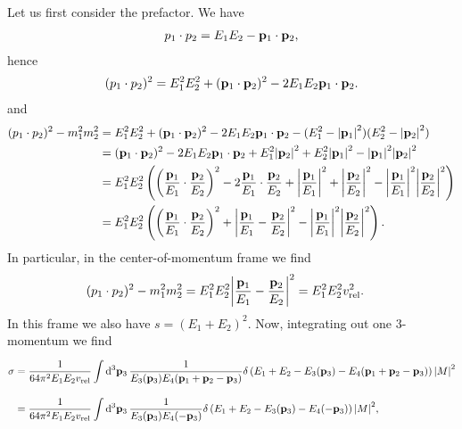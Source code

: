 Let us first consider the prefactor. We have
\begin{align*}
	p_{1}\cdot p_{2} = E_{1}E_{2} - \vb{p}_{1}\cdot\vb{p}_{2},
\end{align*}
hence
\begin{align*}
	(p_{1}\cdot p_{2})^{2} = E_{1}^{2}E_{2}^{2} + (\vb{p}_{1}\cdot\vb{p}_{2})^{2} - 2E_{1}E_{2}\vb{p}_{1}\cdot\vb{p}_{2}.
\end{align*}
and
\begin{align*}
	(p_{1}\cdot p_{2})^{2} - m_{1}^{2}m_{2}^{2} &= E_{1}^{2}E_{2}^{2} + (\vb{p}_{1}\cdot\vb{p}_{2})^{2} - 2E_{1}E_{2}\vb{p}_{1}\cdot\vb{p}_{2} - (E_{1}^{2} - \abs{\vb{p}_{1}}^{2})(E_{2}^{2} - \abs{\vb{p}_{2}}^{2}) \\
	&= (\vb{p}_{1}\cdot\vb{p}_{2})^{2} - 2E_{1}E_{2}\vb{p}_{1}\cdot\vb{p}_{2} + E_{1}^{2}\abs{\vb{p}_{2}}^{2} + E_{2}^{2}\abs{\vb{p}_{1}}^{2} - \abs{\vb{p}_{1}}^{2}\abs{\vb{p}_{2}}^{2} \\
	&= E_{1}^{2}E_{2}^{2}\left(\left(\frac{\vb{p}_{1}}{E_{1}}\cdot\frac{\vb{p}_{2}}{E_{2}}\right)^{2} - 2\frac{\vb{p}_{1}}{E_{1}}\cdot\frac{\vb{p}_{2}}{E_{2}} + \abs{\frac{\vb{p}_{1}}{E_{1}}}^{2} + \abs{\frac{\vb{p}_{2}}{E_{2}}}^{2} - \abs{\frac{\vb{p}_{1}}{E_{1}}}^{2}\abs{\frac{\vb{p}_{2}}{E_{2}}}^{2}\right) \\
	&= E_{1}^{2}E_{2}^{2}\left(\left(\frac{\vb{p}_{1}}{E_{1}}\cdot\frac{\vb{p}_{2}}{E_{2}}\right)^{2} + \abs{\frac{\vb{p}_{1}}{E_{1}} - \frac{\vb{p}_{2}}{E_{2}}}^{2} - \abs{\frac{\vb{p}_{1}}{E_{1}}}^{2}\abs{\frac{\vb{p}_{2}}{E_{2}}}^{2}\right).
\end{align*}
In particular, in the center-of-momentum frame we find
\begin{align*}
	(p_{1}\cdot p_{2})^{2} - m_{1}^{2}m_{2}^{2} &= E_{1}^{2}E_{2}^{2}\abs{\frac{\vb{p}_{1}}{E_{1}} - \frac{\vb{p}_{2}}{E_{2}}}^{2}= E_{1}^{2}E_{2}^{2}v_{\text{rel}}^{2}.
\end{align*}
In this frame we also have $s = (E_{1} + E_{2})^{2}$. Now, integrating out one 3-momentum we find
\begin{align*}
	\sigma &= \frac{1}{64\pi^{2}E_{1}E_{2}v_{\text{rel}}}\int\limits_{}^{}\dd[3]{\vb{p}_{3}}\frac{1}{E_{3}(\vb{p}_{3})E_{4}(\vb{p}_{1} + \vb{p}_{2} - \vb{p}_{3})}\delta\left(E_{1} + E_{2} - E_{3}(\vb{p}_{3}) - E_{4}(\vb{p}_{1} + \vb{p}_{2} - \vb{p}_{3})\right)\abs{M}^{2} \\
	       &= \frac{1}{64\pi^{2}E_{1}E_{2}v_{\text{rel}}}\int\limits_{}^{}\dd[3]{\vb{p}_{3}}\frac{1}{E_{3}(\vb{p}_{3})E_{4}(-\vb{p}_{3})}\delta\left(E_{1} + E_{2} - E_{3}(\vb{p}_{3}) - E_{4}(-\vb{p}_{3})\right)\abs{M}^{2},
\end{align*}
